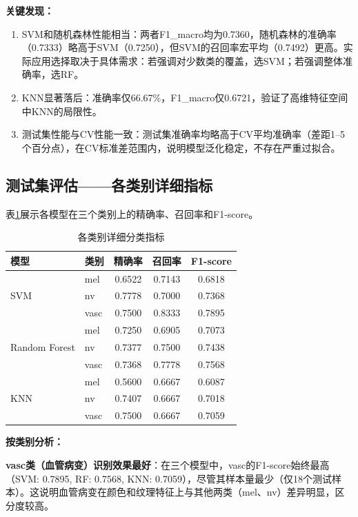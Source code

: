 \documentclass[12pt,a4paper]{ctexart}
\begin{document}
\textbf{关键发现：}
\begin{enumerate}[label=(\arabic*)]
    \item SVM和随机森林性能相当：两者F1\_macro均为0.7360，随机森林的准确率（0.7333）略高于SVM（0.7250），但SVM的召回率宏平均（0.7492）更高。实际应用选择取决于具体需求：若强调对少数类的覆盖，选SVM；若强调整体准确率，选RF。
    \item KNN显著落后：准确率仅66.67\%，F1\_macro仅0.6721，验证了高维特征空间中KNN的局限性。
    \item 测试集性能与CV性能一致：测试集准确率均略高于CV平均准确率（差距1--5个百分点），在CV标准差范围内，说明模型泛化稳定，不存在严重过拟合。
\end{enumerate}

\subsection{测试集评估——各类别详细指标}

表\ref{tab:per_class_metrics}展示各模型在三个类别上的精确率、召回率和F1-score。

\begin{table}[H]
\centering
\caption{各类别详细分类指标}
\label{tab:per_class_metrics}
\begin{tabular}{llccc}
\toprule
\textbf{模型} & \textbf{类别} & \textbf{精确率} & \textbf{召回率} & \textbf{F1-score} \\
\midrule
\multirow{3}{*}{SVM}
    & mel  & 0.6522 & 0.7143 & 0.6818 \\
    & nv   & 0.7778 & 0.7000 & 0.7368 \\
    & vasc & 0.7500 & 0.8333 & 0.7895 \\
\midrule
\multirow{3}{*}{Random Forest}
    & mel  & 0.7250 & 0.6905 & 0.7073 \\
    & nv   & 0.7377 & 0.7500 & 0.7438 \\
    & vasc & 0.7368 & 0.7778 & 0.7568 \\
\midrule
\multirow{3}{*}{KNN}
    & mel  & 0.5600 & 0.6667 & 0.6087 \\
    & nv   & 0.7407 & 0.6667 & 0.7018 \\
    & vasc & 0.7500 & 0.6667 & 0.7059 \\
\bottomrule
\end{tabular}
\end{table}

\textbf{按类别分析：}

\textbf{vasc类（血管病变）识别效果最好}：在三个模型中，vasc的F1-score始终最高（SVM: 0.7895, RF: 0.7568, KNN: 0.7059），尽管其样本量最少（仅18个测试样本）。这说明血管病变在颜色和纹理特征上与其他两类（mel、nv）差异明显，区分度较高。
\end{document}
